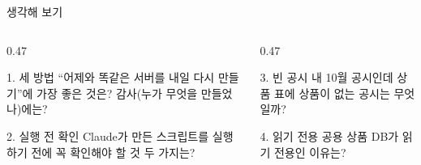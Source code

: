 \begin{frame}{생각해 보기}
\begin{columns}[T]
\begin{column}{0.47\textwidth}
\begin{block}{1. 세 방법}
``어제와 똑같은 서버를 내일 다시 만들기''에 가장 좋은 것은? 감사(누가 무엇을 만들었나)에는?
\end{block}
\begin{block}{2. 실행 전 확인}
Claude가 만든 스크립트를 실행하기 전에 꼭 확인해야 할 것 두 가지는? 
\end{block}
\end{column}
\begin{column}{0.47\textwidth}
\begin{block}{3. 빈 공시}
내 10월 공시인데 상품 표에 상품이 없는 공시는 무엇일까?
\end{block}
\begin{block}{4. 읽기 전용}
공용 상품 DB가 읽기 전용인 이유는?
\end{block}
\end{column}
\end{columns}
\end{frame}
